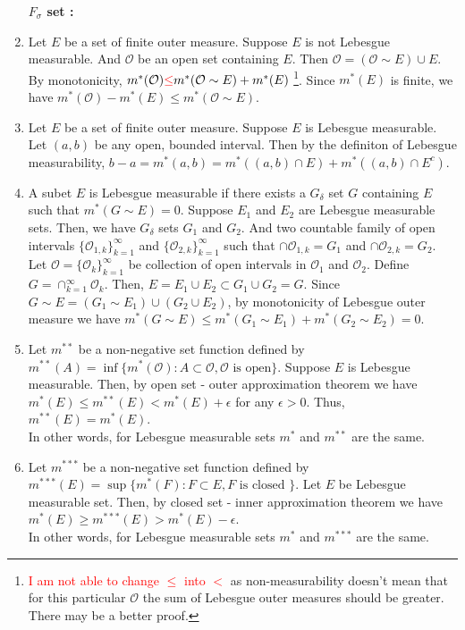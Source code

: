 \begin{enumerate}
	\textbf{$F_\sigma$ set : }
\item
 	Let $E$ be a set of finite outer measure.
	Suppose $E$ is not Lebesgue measurable.
	And $\mathcal{O}$ be an open set containing $E$.
	Then $\mathcal{O} = (\mathcal{O} \sim E) \cup E$.
		By monotonicity, $m^\ast(\mathcal{O}) \textcolor{red}{ \le } m^\ast(\mathcal{O} \sim E) + m^\ast(E)$
		\dag\footnote{\textcolor{red}{I am not able to change $\le$ into $<$} as non-measurability doesn't mean that for this particular $\mathcal{O}$ the sum of Lebesgue outer measures should be greater. There may be a better proof.}.
	Since $m^\ast(E)$ is finite, we have $m^\ast(\mathcal{O}) - m^\ast(E) \le m^\ast(\mathcal{O} \sim E)$.
\item  Let $E$ be a set of finite outer measure.
	Suppose $E$ is Lebesgue measurable.
	Let $(a,b)$ be any open, bounded interval.
	Then by the definiton of Lebesgue measurability, $b-a = m^\ast(a,b) = m^\ast((a,b) \cap E) + m^\ast((a,b) \cap E^c)$.
\item  
 	A subet $E$ is Lebesgue measurable if there exists a $G_\delta$ set $G$ containing $E$ such that $m^\ast(G \sim E) = 0$.
	Suppose $E_1$ and $E_2$ are Lebesgue measurable sets.	
	Then, we have $G_\delta$ sets $G_1$ and $G_2$.
	And two countable family of open intervals $\{\mathcal{O}_{1,k}\}_{k=1}^\infty$ and $\{ \mathcal{O}_{2,k}\}_{k=1}^\infty$ such that $\cap \mathcal{O}_{1,k} = G_1$ and $\cap \mathcal{O}_{2,k} = G_2$.
	Let $\mathcal{O} = \{ \mathcal{O}_k \}_{k=1}^\infty$ be collection of open intervals in $\mathcal{O}_1$ and $\mathcal{O}_2$.
	Define $G = \cap_{k=1}^\infty \mathcal{O}_k$.
	Then, $E = E_1 \cup E_2 \subset G_1 \cup G_2 = G$.
	Since $G \sim E = (G_1 \sim E_1) \cup (G_2 \cup E_2)$, by monotonicity of Lebesgue outer measure we have $m^\ast(G \sim E) \le m^\ast(G_1 \sim E_1) + m^\ast(G_2 \sim E_2) = 0$.
\item
	Let $m^{\ast\ast}$ be a non-negative set function defined by $m^{\ast\ast}(A) = \inf \{ m^\ast(\mathcal{O}) : A \subset \mathcal{O}, \mathcal{O} \text{ is open} \}$.
	Suppose $E$ is Lebesgue measurable.
	Then, by open set - outer approximation theorem
	we have $m^\ast(E) \le m^{\ast\ast}(E) < m^\ast(E) + \epsilon$ for any $\epsilon > 0$.
	Thus, $m^{\ast\ast}(E) = m^\ast(E)$. \\

	In other words, for Lebesgue measurable sets $m^\ast$ and $m^{\ast\ast}$ are the same.
\item  
	Let $m^{\ast\ast\ast}$ be a non-negative set function defined by $m^{\ast\ast\ast}(E) = \sup \{ m^\ast(F) : F \subset E, F \text{ is closed } \}$.
	Let $E$ be Lebesgue measurable set.
	Then, by closed set - inner approximation theorem
	we have $m^\ast(E) \ge m^{\ast\ast\ast}(E) > m^\ast(E)-\epsilon$.\\

	In other words, for Lebesgue measurable sets $m^\ast$ and $m^{\ast\ast\ast}$ are the same.
\end{enumerate}
